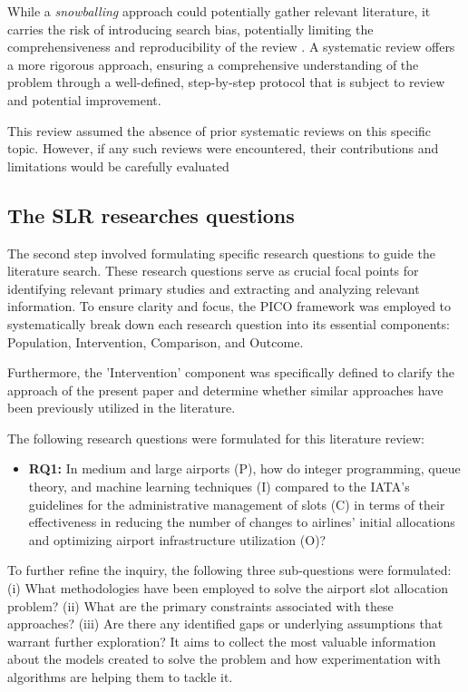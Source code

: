While a \textit{snowballing} approach could potentially gather relevant literature, it carries the risk of introducing search bias, potentially limiting the comprehensiveness and reproducibility of the review \cite{jalali2012systematic}. A systematic review offers a more rigorous approach, ensuring a comprehensive understanding of the problem through a well-defined, step-by-step protocol that is subject to review and potential improvement.

This review assumed the absence of prior systematic reviews on this specific topic. However, if any such reviews were encountered, their contributions and limitations would be carefully evaluated

\subsection{The \acrshort{SLR} researches questions}

The second step involved formulating specific research questions to guide the literature search. These research questions serve as crucial focal points for identifying relevant primary studies and extracting and analyzing relevant information. To ensure clarity and focus, the PICO framework was employed to systematically break down each research question into its essential components: Population, Intervention, Comparison, and Outcome.

Furthermore, the 'Intervention' component was specifically defined to clarify the approach of the present paper and determine whether similar approaches have been previously utilized in the literature.

The following research questions were formulated for this literature review:

\begin{itemize}
    \item \textbf{RQ1:} In medium and large airports (P), how do integer programming, queue theory, and machine learning techniques (I)  compared to the \acrshort{IATA}'s guidelines for the administrative management of slots (C) in terms of their effectiveness in reducing the number of changes to airlines' initial allocations and optimizing airport infrastructure utilization (O)?
\end{itemize}

To further refine the inquiry, the following three sub-questions were formulated: (i) What methodologies have been employed to solve the airport slot allocation problem? (ii) What are the primary constraints associated with these approaches? (iii) Are there any identified gaps or underlying assumptions that warrant further exploration? It aims to collect the most valuable information about the models created to solve the problem and how experimentation with algorithms are helping them to tackle it.

